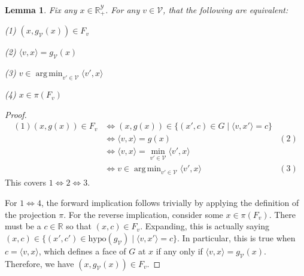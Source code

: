 \documentclass[11pt]{article}
\newcommand{\reals}{\mathbb{R}}
\newcommand{\V}{\mathcal{V}}
\newcommand{\Y}{\mathcal{Y}}
\newcommand{\inprod}[2]{\langle #1, #2 \rangle}%
\newcommand{\hyp}{\mathrm{hypo}}
\DeclareMathOperator*{\argmin}{arg\,min}
\newtheorem{lemma}{Lemma}
\begin{document}
\begin{lemma}\label{lem:projected-faces-iff-support-iff-argmin}
	Fix any $x \in \reals^\Y_+$.
	For any $v \in \V$, that the following are equivalent: 
	
	
	(1) $(x,g_\V(x)) \in F_v$
	
	(2) $\inprod{v}{x}= g_\V(x)$
	
	(3) $v \in \argmin_{v' \in \V} \inprod{v'}{x}$
	
	(4) $x \in \pi(F_v)$
\end{lemma}
\begin{proof}
	\begin{align*}
	(1) (x,g(x)) \in F_v
	&\iff (x,g(x)) \in \{(x',c) \in G \mid \inprod{v}{x'} = c\} & \\
	&\iff  \inprod{v}{x} = g(x) & (2)\\
	&\iff \inprod{v}{x} = \min_{v' \in \V}\inprod{v'}{x} & \\
	&\iff v \in \argmin_{v' \in \V}\inprod{v'}{x} & (3)
	\end{align*}
	This covers $1 \iff 2 \iff 3$.
	
	For $1 \iff 4$, the forward implication follows trivially by applying the definition of the projection $\pi$.
	For the reverse implication, consider some $x \in \pi(F_v)$.
	There must be a $c \in \reals$ so that $(x,c) \in F_v$.
	Expanding, this is actually saying $(x,c) \in \{(x',c') \in \hyp(g_\V) \mid \inprod{v}{x'} = c\}$.
	In particular, this is true when $c = \inprod{v}{x}$, which defines a face of $G$ at $x$ if any only if $\inprod{v}{x} = g_\V(x)$.
	Therefore, we have $(x, g_\V(x)) \in F_v$.
\end{proof}
\end{document}
